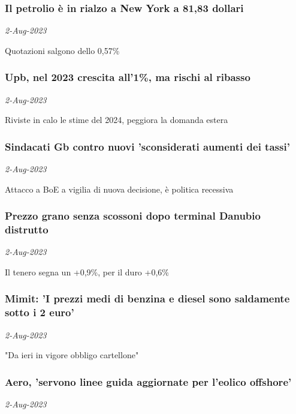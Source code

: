 \subsubsection{Il petrolio \`{e} in rialzo a New York a 81,83 dollari \href{https://www.ansa.it/sito/notizie/economia/2023/08/02/il-petrolio-e-in-rialzo-a-new-york-a-8183-dollari_8ad13714-68fc-427d-bdc7-72f35dd970cf.html}{}}
\textit{2-Aug-2023}

Quotazioni salgono dello 0,57\%
\subsubsection{Upb, nel 2023 crescita all'1\%, ma rischi al ribasso \href{https://www.ansa.it/sito/notizie/economia/2023/08/02/upb-nel-2023-crescita-all1-ma-rischi-al-ribasso_6dc43ea1-215c-4654-bfdf-b1dd03164078.html}{}}
\textit{2-Aug-2023}

Riviste in calo le stime del 2024, peggiora la domanda estera
\subsubsection{Sindacati Gb contro nuovi 'sconsiderati aumenti dei tassi' \href{https://www.ansa.it/sito/notizie/economia/2023/08/02/sindacati-gb-contro-nuovi-sconsiderati-aumenti-dei-tassi_56273581-2f53-4d28-be5d-8a72c19e7dca.html}{}}
\textit{2-Aug-2023}

Attacco a BoE a vigilia di nuova decisione, \`{e} politica recessiva
\subsubsection{Prezzo grano senza scossoni dopo terminal Danubio distrutto \href{https://www.ansa.it/sito/notizie/economia/2023/08/02/prezzo-grano-senza-scossoni-dopo-terminal-danubio-distrutto_83701c25-6399-4ddf-b794-2ffe3c316f79.html}{}}
\textit{2-Aug-2023}

Il tenero segna un +0,9\%, per il duro +0,6\%
\subsubsection{Mimit: 'I prezzi medi di benzina e diesel sono saldamente sotto i 2 euro' \href{https://www.ansa.it/sito/notizie/economia/2023/08/02/-mimit-prezzi-medi-benzina-e-diesel-saldamente-sotto-2-euro-_9d5f18e2-7b86-4720-b465-d7cf70685258.html}{}}
\textit{2-Aug-2023}

"Da ieri in vigore obbligo cartellone"
\subsubsection{Aero, 'servono linee guida aggiornate per l'eolico offshore' \href{https://www.ansa.it/sito/notizie/economia/2023/08/02/aero-servono-linee-guida-aggiornate-per-leolico-offshore_7c99876a-ed54-40f9-beb1-91a2cbaf29b8.html}{}}
\textit{2-Aug-2023}

